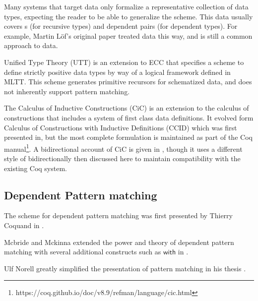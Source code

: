 Many systems that target data only formalize a representative collection of data types, expecting the reader to be able to generalize the scheme.
This data usually covers \Nat{}s (for recursive types) and dependent pairs (for dependent types). %
For example, Martin L{\"o}f's original paper treated data this way, and is still a common approach to data. %


Unified Type Theory (UTT)\cite{luo1990extended,luo1994computation} is an extension to ECC that specifies a scheme to define strictly positive data types by way of a logical framework defined in \ac{MLTT}.
This scheme generates primitive recursors for schematized data, and does not inherently support pattern matching.

The Calculus of Inductive Constructions (CiC) is an extension to the calculus of constructions that includes a system of first class data definitions.
It evolved form Calculus of Constructions with Inductive Definitions (CCID) which was first presented in, \cite{10.1007/BFb0037116} but the most complete formulation is maintained as part of the Coq manual\footnote{https://coq.github.io/doc/v8.9/refman/language/cic.html}.
A bidirectional account of CiC is given in \cite{lennonbertrand:LIPIcs.ITP.2021.24}, though it uses a different style of bidirectionally then discussed here to maintain compatibility with the existing Coq system.


\subsection{Dependent Pattern matching}


The scheme for dependent pattern matching was first presented by Thierry Coquand in \cite{coquand1992pattern}.

Mcbride and Mckinna extended the power and theory of dependent pattern matching with several additional constructs such as $\mathsf{with}$ in \cite{mcbride_mckinna_2004}.

Ulf Norell greatly simplified the presentation of pattern matching in his thesis \cite{norell2007towards}.

